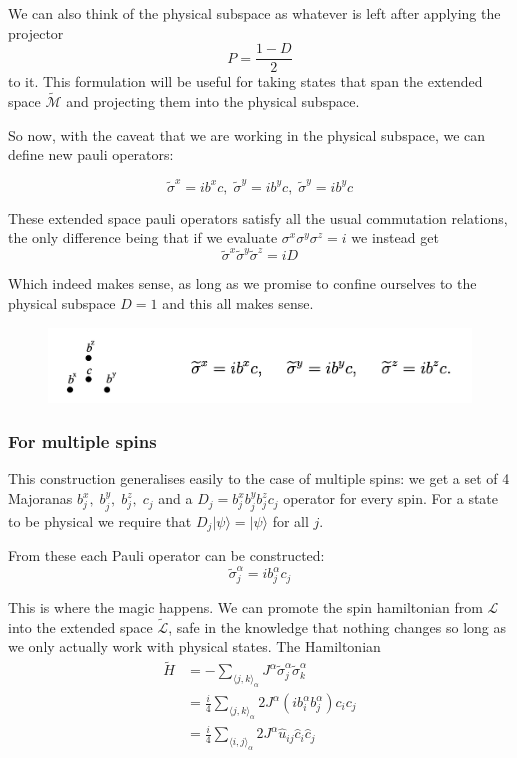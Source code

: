 We can also think of the physical subspace as whatever is left after
applying the projector \[P  = \frac{1 - D}{2}\] to it. This formulation
will be useful for taking states that span the extended space
\(\mathcal{\tilde{M}}\) and projecting them into the physical subspace.

So now, with the caveat that we are working in the physical subspace, we
can define new pauli operators:

\[\tilde{\sigma}^x = i b^x c,\; \tilde{\sigma}^y = i b^y c,\; \tilde{\sigma}^y = i b^y c\]

These extended space pauli operators satisfy all the usual commutation
relations, the only difference being that if we evaluate
\(\sigma^x \sigma^y \sigma^z = i\) we instead get
\[ \tilde{\sigma}^x\tilde{\sigma}^y\tilde{\sigma}^z = iD \]

Which indeed makes sense, as long as we promise to confine ourselves to
the physical subspace \(D = 1\) and this all makes sense.

\begin{figure}
\hypertarget{fig:majorana}{%
\centering
\includegraphics{figure_code/majorana.png}
\caption{}\label{fig:majorana}
}
\end{figure}

\hypertarget{for-multiple-spins}{%
\subsubsection{For multiple spins}\label{for-multiple-spins}}

This construction generalises easily to the case of multiple spins: we
get a set of 4 Majoranas \(b^x_j,\; b^y_j,\;b^z_j,\; c_j\) and a
\(D_j = b^x_jb^y_jb^z_jc_j\) operator for every spin. For a state to be
physical we require that \(D_j |\psi\rangle = |\psi\rangle\) for all
\(j\).

From these each Pauli operator can be constructed:
\[\tilde{\sigma}^\alpha_j = i b^\alpha_j c_j\]

This is where the magic happens. We can promote the spin hamiltonian
from \(\mathcal{L}\) into the extended space \(\mathcal{\tilde{L}}\),
safe in the knowledge that nothing changes so long as we only actually
work with physical states. The Hamiltonian \[\begin{aligned}
\tilde{H} &=  - \sum_{\langle j,k\rangle_\alpha} J^{\alpha}\tilde{\sigma}_j^{\alpha}\tilde{\sigma}_k^{\alpha}\\
          &= \frac{i}{4} \sum_{\langle j,k\rangle_\alpha} 2J^{\alpha} (ib^\alpha_i b^\alpha_j) c_i c_j\\
          &=  \frac{i}{4} \sum_{\langle i,j\rangle_\alpha} 2J^{\alpha} \hat{u}_{ij} \hat{c}_i \hat{c}_j
\end{aligned}\]

